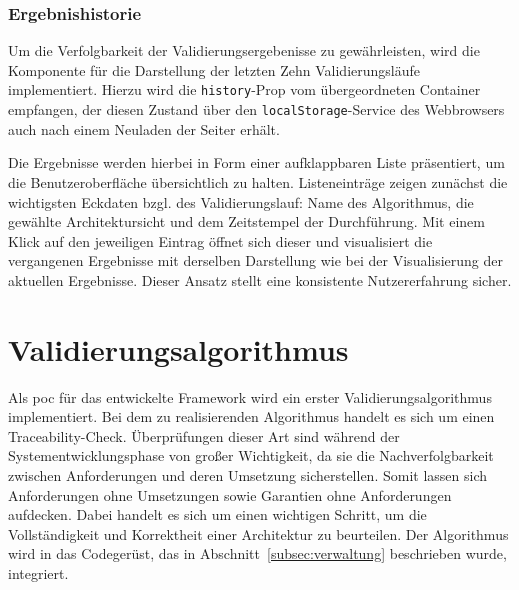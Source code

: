 \subsubsection*{Ergebnishistorie}

Um die Verfolgbarkeit der Validierungsergebenisse zu gewährleisten, wird die Komponente für die Darstellung der letzten Zehn Validierungsläufe implementiert. Hierzu wird die \texttt{history}-Prop vom übergeordneten Container empfangen, der diesen Zustand über den \texttt{localStorage}-Service des Webbrowsers auch nach einem Neuladen der Seiter erhält.

Die Ergebnisse werden hierbei in Form einer aufklappbaren Liste präsentiert, um die Benutzeroberfläche übersichtlich zu halten. Listeneinträge zeigen zunächst die wichtigsten Eckdaten bzgl. des Validierungslauf: Name des Algorithmus, die gewählte Architektursicht und dem Zeitstempel der Durchführung. Mit einem Klick auf den jeweiligen Eintrag öffnet sich dieser und visualisiert die vergangenen Ergebnisse mit derselben Darstellung wie bei der Visualisierung der aktuellen Ergebnisse. Dieser Ansatz stellt eine konsistente Nutzererfahrung sicher.
\section{Validierungsalgorithmus}
\label{sec:validimp}

Als \gls{poc} für das entwickelte Framework wird ein erster Validierungsalgorithmus implementiert. Bei dem zu realisierenden Algorithmus handelt es sich um einen Traceability-Check. Überprüfungen dieser Art sind während der Systementwicklungsphase von großer Wichtigkeit, da sie die Nachverfolgbarkeit zwischen Anforderungen und deren Umsetzung sicherstellen. Somit lassen sich Anforderungen ohne Umsetzungen sowie Garantien ohne Anforderungen aufdecken. Dabei handelt es sich um einen wichtigen Schritt, um die Vollständigkeit und Korrektheit einer Architektur zu beurteilen. Der Algorithmus wird in das Codegerüst, das in Abschnitt~\ref{subsec:verwaltung} beschrieben wurde, integriert.

